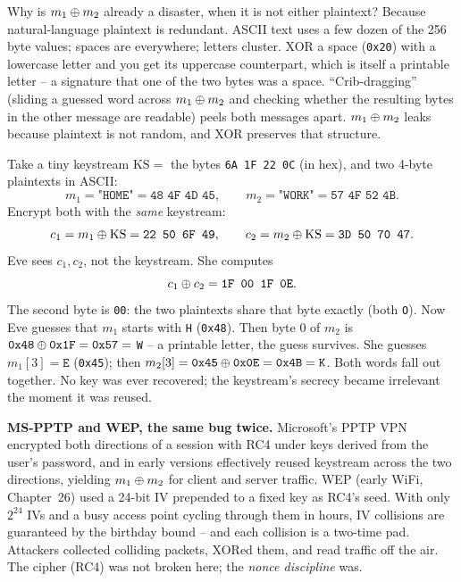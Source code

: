 \begin{walkbox}
Why is $m_1 \oplus m_2$ already a disaster, when it is not either plaintext? Because natural-language plaintext is redundant. ASCII text uses a few dozen of the 256 byte values; spaces are everywhere; letters cluster. XOR a space (\texttt{0x20}) with a lowercase letter and you get its uppercase counterpart, which is itself a printable letter -- a signature that one of the two bytes was a space. ``Crib-dragging'' (sliding a guessed word across $m_1 \oplus m_2$ and checking whether the resulting bytes in the other message are readable) peels both messages apart. $m_1 \oplus m_2$ leaks because plaintext is not random, and XOR preserves that structure.
\end{walkbox}

\begin{example}
\label{ch38:ex-two-time}
Take a tiny keystream $\mathrm{KS} = $ the bytes \texttt{6A 1F 22 0C} (in hex), and two 4-byte plaintexts in ASCII:
\[
m_1 = \texttt{"HOME"}=\texttt{48 4F 4D 45}, \qquad m_2 = \texttt{"WORK"}=\texttt{57 4F 52 4B}.
\]
Encrypt both with the \emph{same} keystream:
\[
c_1 = m_1 \oplus \mathrm{KS} = \texttt{22 50 6F 49}, \qquad
c_2 = m_2 \oplus \mathrm{KS} = \texttt{3D 50 70 47}.
\]
Eve sees $c_1, c_2$, not the keystream. She computes
\[
c_1 \oplus c_2 = \texttt{1F 00 1F 0E}.
\]
The second byte is \texttt{00}: the two plaintexts share that byte exactly (both \texttt{O}). Now Eve guesses that $m_1$ starts with \texttt{H} (\texttt{0x48}). Then byte 0 of $m_2$ is $\texttt{0x48} \oplus \texttt{0x1F} = \texttt{0x57} = $ \texttt{W} -- a printable letter, the guess survives. She guesses $m_1[3]=\texttt{E}$ (\texttt{0x45}); then $m_2[3] = \texttt{0x45}\oplus\texttt{0x0E}=\texttt{0x4B}=\texttt{K}$. Both words fall out together. No key was ever recovered; the keystream's secrecy became irrelevant the moment it was reused.
\end{example}

\begin{attackbox}
\textbf{MS-PPTP and WEP, the same bug twice.} Microsoft's PPTP VPN encrypted both directions of a session with RC4 under keys derived from the user's password, and in early versions effectively reused keystream across the two directions, yielding $m_1 \oplus m_2$ for client and server traffic. WEP (early WiFi, Chapter~26) used a 24-bit IV prepended to a fixed key as RC4's seed. With only $2^{24}$ IVs and a busy access point cycling through them in hours, IV collisions are guaranteed by the birthday bound -- and each collision is a two-time pad. Attackers collected colliding packets, XORed them, and read traffic off the air. The cipher (RC4) was not broken here; the \emph{nonce discipline} was.
\end{attackbox}

